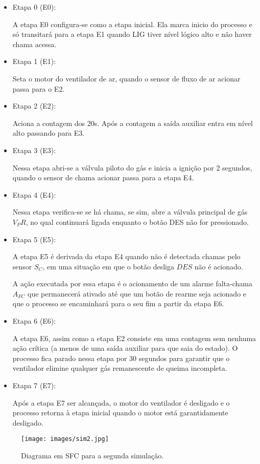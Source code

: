 \begin{itemize}
    \item Etapa 0 (E0): 
    
    A etapa E0 configura-se como a etapa inicial. Ela marca inicio do processo e só transitará para a etapa E1 quando LIG tiver nível lógico alto e não haver chama acessa.
    \item Etapa 1 (E1): 
    
    Seta o motor do ventilador de ar, quando o sensor de fluxo de ar acionar passa para o E2.
    
    \item Etapa 2 (E2): 
    
    Aciona a contagem dos 20s. Após a contagem a saída auxiliar entra em nível alto passando para E3.
    
    \item Etapa 3 (E3):
    
    Nessa etapa abri-se a válvula piloto do gás e inicia a ignição por 2 segundos, quando o sensor de chama acionar passa para a etapa E4.
    
    \item Etapa 4 (E4):
    
    Nessa etapa verifica-se se há chama, se sim, abre a válvula principal de gás $V_PR$, no qual continuará ligada enquanto o botão DES não for pressionado.  
    
    \item Etapa 5 (E5):
    
    A etapa E5 é derivada da etapa E4 quando não é detectada chamas pelo sensor $S_C$, em uma situação em que o botão desliga $DES$ não é acionado.
    
    A ação executada por essa etapa é o acionamento de um alarme falta-chama $A_{FC}$ que permanecerá ativado até que um botão de rearme seja acionado e que o processo se encaminhará para o seu fim a partir da etapa E6.
    
    \item Etapa 6 (E6):
    
    A etapa E6, assim como a etapa E2 consiste em uma contagem sem nenhuma ação crítica (a menos de uma saída auxiliar para que saia do estado). O processo fica parado nessa etapa por 30 segundos para garantir que o ventilador elimine qualquer gás remanescente de queima incompleta.
    
    \item Etapa 7 (E7):

    Após a etapa E7 ser alcançada, o motor do ventilador é desligado e o processo retorna à etapa inicial quando o motor está garantidamente desligado.

\end{itemize}

\begin{figure}[H] 
\centering
\texttt{[image: images/sim2.jpg]}
\caption{Diagrama em SFC para a segunda simulação.}
\label{sim1]2} 
\end{figure}
